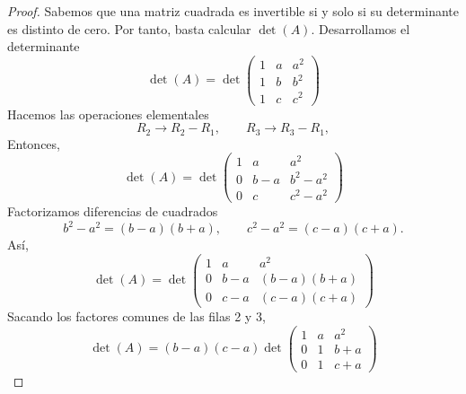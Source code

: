 \documentclass[12pt,a4paper]{article}
\begin{document}
    \begin{proof}
        Sabemos que una matriz cuadrada es invertible si y solo si su determinante es distinto
        de cero. Por tanto, basta calcular $\det(A)$. Desarrollamos el determinante
        \begin{equation*}
            \det(A)=\det
            \begin{pmatrix}
                1 & a & a^{2}\\
                1 & b & b^{2}\\
                1 & c & c^{2}
            \end{pmatrix}
        \end{equation*}
        Hacemos las operaciones elementales
        \begin{equation*}
            R_{2}\rightarrow R_{2}-R_{1},\qquad R_{3}\rightarrow R_{3}-R_{1},
        \end{equation*}
        Entonces,
        \begin{equation*}
            \det(A)=\det
            \begin{pmatrix}
                1 & a & a^{2}\\
                0 & b-a & b^{2}-a^{2}\\
                0 & c & c^{2}-a^{2}
            \end{pmatrix}
        \end{equation*}
        Factorizamos diferencias de cuadrados
        \begin{equation*}
            b^{2}-a^{2}=(b-a)(b+a),\qquad c^{2}-a^{2}=(c-a)(c+a).
        \end{equation*}
        Así,
        \begin{equation*}
            \det(A)=\det
            \begin{pmatrix}
                1 & a & a^{2}\\
                0 & b-a & (b-a)(b+a)\\
                0 & c-a & (c-a)(c+a)
            \end{pmatrix}
        \end{equation*}
        Sacando los factores comunes de las filas 2 y 3,
        \begin{equation*}
            \det(A)=(b-a)(c-a)\det
            \begin{pmatrix}
                1 & a & a^{2}\\
                0 & 1 & b+a\\
                0 & 1 & c+a
            \end{pmatrix}

\end{equation*}
\end{proof}
\end{document}
